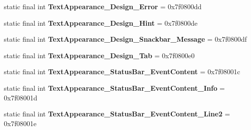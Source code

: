 \begin{DoxyCompactItemize}
\item 
\hypertarget{classandroid_1_1support_1_1design_1_1_r_1_1style_accab8ab0c293a8370ea192578d8dbcec}{}static final int {\bfseries Text\+Appearance\+\_\+\+Design\+\_\+\+Error} = 0x7f0800dd\label{classandroid_1_1support_1_1design_1_1_r_1_1style_accab8ab0c293a8370ea192578d8dbcec}

\item 
\hypertarget{classandroid_1_1support_1_1design_1_1_r_1_1style_a2b8b92db31ec208aacc3f0d62cedec8b}{}static final int {\bfseries Text\+Appearance\+\_\+\+Design\+\_\+\+Hint} = 0x7f0800de\label{classandroid_1_1support_1_1design_1_1_r_1_1style_a2b8b92db31ec208aacc3f0d62cedec8b}

\item 
\hypertarget{classandroid_1_1support_1_1design_1_1_r_1_1style_ac85d0ef831a6f8f8ea0ff291900abc78}{}static final int {\bfseries Text\+Appearance\+\_\+\+Design\+\_\+\+Snackbar\+\_\+\+Message} = 0x7f0800df\label{classandroid_1_1support_1_1design_1_1_r_1_1style_ac85d0ef831a6f8f8ea0ff291900abc78}

\item 
\hypertarget{classandroid_1_1support_1_1design_1_1_r_1_1style_ae7a00e72875b359ac34740afb028c67d}{}static final int {\bfseries Text\+Appearance\+\_\+\+Design\+\_\+\+Tab} = 0x7f0800e0\label{classandroid_1_1support_1_1design_1_1_r_1_1style_ae7a00e72875b359ac34740afb028c67d}

\item 
\hypertarget{classandroid_1_1support_1_1design_1_1_r_1_1style_a4e9980404e1bb076718a926f8cc126dc}{}static final int {\bfseries Text\+Appearance\+\_\+\+Status\+Bar\+\_\+\+Event\+Content} = 0x7f08001c\label{classandroid_1_1support_1_1design_1_1_r_1_1style_a4e9980404e1bb076718a926f8cc126dc}

\item 
\hypertarget{classandroid_1_1support_1_1design_1_1_r_1_1style_aa91ffb500f43744b59f5dab707e234c5}{}static final int {\bfseries Text\+Appearance\+\_\+\+Status\+Bar\+\_\+\+Event\+Content\+\_\+\+Info} = 0x7f08001d\label{classandroid_1_1support_1_1design_1_1_r_1_1style_aa91ffb500f43744b59f5dab707e234c5}

\item 
\hypertarget{classandroid_1_1support_1_1design_1_1_r_1_1style_ab14526186d20ab6c5d08c69ee5c4a278}{}static final int {\bfseries Text\+Appearance\+\_\+\+Status\+Bar\+\_\+\+Event\+Content\+\_\+\+Line2} = 0x7f08001e\label{classandroid_1_1support_1_1design_1_1_r_1_1style_ab14526186d20ab6c5d08c69ee5c4a278}


\end{DoxyCompactItemize}
